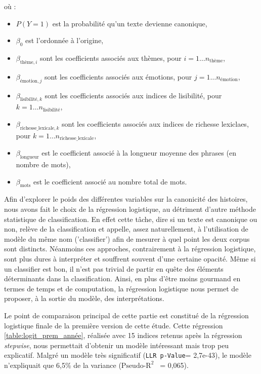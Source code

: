 \documentclass[12pt,a4paper,oneside,titlepage]{book} %
\begin{document}
où :
\begin{itemize}
    \item \(P(Y=1)\) est la probabilité qu’un texte devienne canonique,
    \item \(\beta_0\) est l’ordonnée à l’origine,
    \item \(\beta_{\text{thème},i}\) sont les coefficients associés aux thèmes, pour \(i = 1 \dots n_{\text{thème}}\),
    \item \(\beta_{\text{émotion},j}\) sont les coefficients associés aux émotions, pour \(j = 1 \dots n_{\text{émotion}}\),
    \item \(\beta_{\text{lisibilité},k}\) sont les coefficients associés aux indices de lisibilité, pour \(k = 1 \dots n_{\text{lisibilité}}\),
    \item \(\beta_{\text{richesse\_lexicale},k}\) sont les coefficients associés aux indices de richesse lexiclaes, pour \(k = 1 \dots n_{\text{richesse\_lexicale}}\),
    \item \(\beta_{\text{longueur}}\) est le coefficient associé à la longueur moyenne des phrases (en nombre de mots),
    \item \(\beta_{\text{mots}}\) est le coefficient associé au nombre total de mots.
\end{itemize}

Afin d'explorer le poids des différentes variables sur la canonicité des histoires, nous avons fait le choix de la régression logistique, au détriment d'autre méthode statistique de classification. En effet cette tâche, dire si un texte est canonique ou non, relève de la classification et appelle, assez naturellement, à l'utilisation de modèle du même nom ('classifier') afin de mesurer à quel point les deux corpus sont distincts. Néanmoins ces approches, contrairement à la régression logistique, sont plus dures à interpréter et souffrent souvent d'une certaine opacité. Même si un classifier est bon, il n'est pas trivial de partir en quête des éléments déterminants dans la classification. 
Ainsi, en plus d'être moins gourmand en termes de temps et de computation, la régression logistique nous permet de proposer, à la sortie du modèle, des interprétations. 

Le point de comparaison principal de cette partie est constitué de la régression logistique finale de la première version de cette étude. 
Cette régression \ref{table:logit_prem_année}, réalisée avec 15 indices retenus après la régression \textit{stepwise}, nous permettait d'obtenir un modèle intéressant mais trop peu explicatif. Malgré un modèle très significatif (\texttt{LLR p-Value}= 2,7e-43), le modèle n'expliquait que 6,5\% de la variance (\texttt{$\text{Pseudo-R}^2$ } = 0,065).
\end{document}
